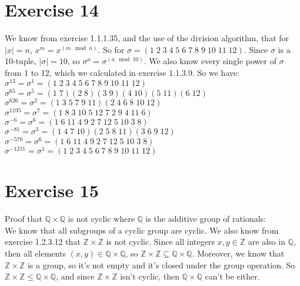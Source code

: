 \documentclass{article}
\newcommand{\Z}{\mathbb{Z}}
\newcommand{\Q}{\mathbb{Q}}
\begin{document}
    \section*{Exercise 14}
    We know from exercise 1.1.1.35, and the use of the division
    algorithm, that for $|x| = n$, $x^m = x^{(m \mod n)}$.
    So for $\sigma = (1\;2\;3\;4\;5\;6\;7\;8\;9\;10\;11\;12)$.
    Since $\sigma$ is a 10-tuple, $|\sigma| = 10$,
    so $\sigma^a = \sigma^{(a \mod 10)}$.
    We also know every single power of $\sigma$ from 1 to 12,
    which we calculated in exercise 1.1.3.9.
    So we have: \\
    $\sigma^{13} = \sigma^1 = (1\;2\;3\;4\;5\;6\;7\;8\;9\;10\;11\;12)$ \\
    $\sigma^{65} = \sigma^5 = (1\;7)(2\;8)(3\;9)(4\;10)(5\;11)(6\;12)$ \\
    $\sigma^{626} = \sigma^2 = (1\;3\;5\;7\;9\;11)(2\;4\;6\;8\;10\;12)$ \\
    $\sigma^{1195} = \sigma^7 = (1\;8\;3\;10\;5\;12\;7\;2\;9\;4\;11\;6)$ \\
    $\sigma^{-6} = \sigma^6 = (1\;6\;11\;4\;9\;2\;7\;12\;5\;10\;3\;8)$ \\
    $\sigma^{-81} = \sigma^3 = (1\;4\;7\;10)(2\;5\;8\;11)(3\;6\;9\;12)$ \\
    $\sigma^{-570} = \sigma^6 = (1\;6\;11\;4\;9\;2\;7\;12\;5\;10\;3\;8)$ \\
    $\sigma^{-1211} = \sigma^1 = (1\;2\;3\;4\;5\;6\;7\;8\;9\;10\;11\;12)$


    \section*{Exercise 15}
    Proof that $\Q \times \Q$ is not cyclic
    where $\Q$ is the additive group of rationals: \\
    We know that all subgroups of a cyclic group are cyclic.
    We also know from exercise 1.2.3.12 that $\Z \times \Z$
    is not cyclic.
    Since all integers $x, y \in \Z$ are also in $\Q$,
    then all elements $(x, y) \in \Q \times \Q$,
    so $\Z \times \Z \subseteq \Q \times \Q$.
    Moreover, we know that $\Z \times \Z$ is a group,
    so it's not empty and it's closed under the group operation.
    So $\Z \times \Z \leqslant \Q \times \Q$,
    and since $\Z \times \Z$ isn't cyclic,
    then $\Q \times \Q$ can't be either.
\end{document}
